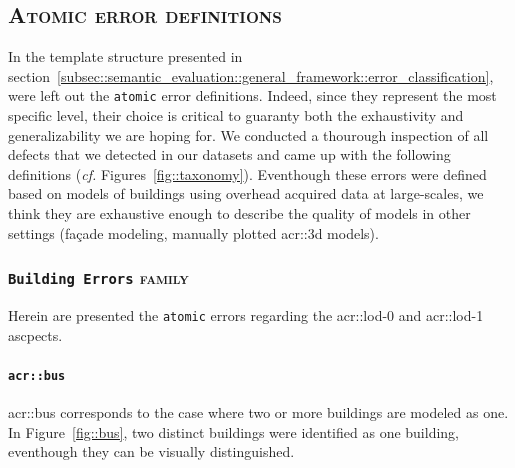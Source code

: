     \subsection{\textsc{Atomic error definitions}}
        \label{subsec::semantic_evaluation::overhead::atomic}
        In the template structure presented in section~\ref{subsec::semantic_evaluation::general_framework::error_classification}, were left out the \texttt{atomic} error definitions.
        Indeed, since they represent the most specific level, their choice is critical to guaranty both the exhaustivity and generalizability we are hoping for.
        We conducted a thourough inspection of all defects that we detected in our datasets and came up with the following definitions (\textit{cf.} Figures~\ref{fig::taxonomy}).
        Eventhough these errors were defined based on models of buildings using overhead acquired data at large-scales, we think they are exhaustive enough to describe the quality of models in other settings (fa\c{c}ade modeling, manually plotted \gls{acr::3d} models).

        \subsubsection{\texttt{Building Errors} \textsc{family}}
            Herein are presented the \texttt{atomic} errors regarding the \gls{acr::lod}-0 and \gls{acr::lod}-1 ascpects.

            \paragraph{\texttt{\acrlong*{acr::bus}}}
                \gls{acr::bus} corresponds to the case where two or more buildings are modeled as one.
                In Figure~\ref{fig::bus}, two distinct buildings were identified as one building, eventhough they can be visually distinguished.\\

